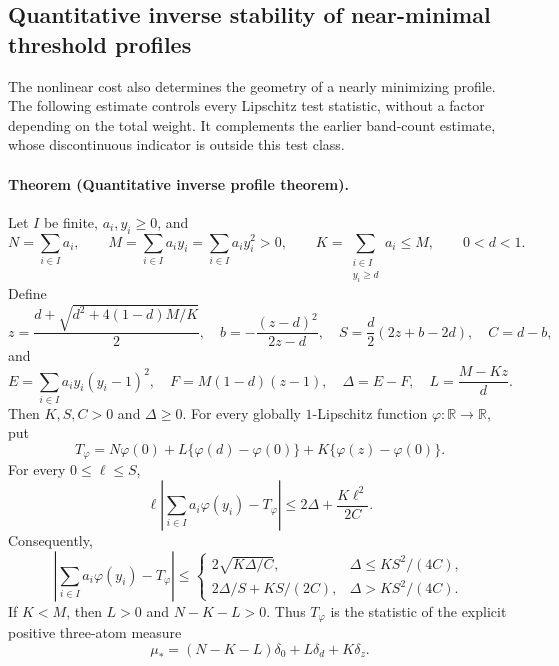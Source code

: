 \subsection{Quantitative inverse stability of near-minimal threshold profiles}
\label{subsec:threshold-transport-stability}

The nonlinear cost also determines the geometry of a nearly minimizing
profile.  The following estimate controls every Lipschitz test statistic,
without a factor depending on the total weight.  It complements the earlier
band-count estimate, whose discontinuous indicator is outside this test class.

\paragraph{Theorem (Quantitative inverse profile theorem).}
\label{thm:threshold-transport-stability}
Let \(I\) be finite, \(a_i,y_i\ge0\), and
\[
 N=\sum_{i\in I}a_i,\qquad
 M=\sum_{i\in I}a_i y_i=\sum_{i\in I}a_i y_i^2>0,\qquad
 K=\sum_{\substack{i\in I\\y_i\ge d}}a_i\le M,\qquad 0<d<1.
\]
Define
\[
 z=\frac{d+\sqrt{d^2+4(1-d)M/K}}2,\quad
 b=-\frac{(z-d)^2}{2z-d},\quad
 S=\frac d2(2z+b-2d),\quad C=d-b,
\]
and
\[
 E=\sum_{i\in I}a_i y_i(y_i-1)^2,\quad
 F=M(1-d)(z-1),\quad \Delta=E-F,\quad
 L=\frac{M-Kz}{d}.
\]
Then \(K,S,C>0\) and \(\Delta\ge0\).  For every globally
\(1\)-Lipschitz function \(\varphi:\mathbb R\to\mathbb R\), put
\[
 T_\varphi=N\varphi(0)+L\{\varphi(d)-\varphi(0)\}
                   +K\{\varphi(z)-\varphi(0)\}.
\]
For every \(0\le\ell\le S\),
\begin{equation}\label{eq:threshold-transport-tilt}
 \ell\left|\sum_{i\in I}a_i\varphi(y_i)-T_\varphi\right|
 \le 2\Delta+\frac{K\ell^2}{2C}.
\end{equation}
Consequently,
\begin{equation}\label{eq:threshold-transport-inverse}
 \left|\sum_{i\in I}a_i\varphi(y_i)-T_\varphi\right|
 \le
 \begin{cases}
  2\sqrt{K\Delta/C},&\Delta\le KS^2/(4C),\\
  2\Delta/S+KS/(2C),&\Delta>KS^2/(4C).
 \end{cases}
\end{equation}
If \(K<M\), then \(L>0\) and \(N-K-L>0\).  Thus \(T_\varphi\)
is the statistic of the explicit positive three-atom measure
\[
 \mu_*=(N-K-L)\delta_0+L\delta_d+K\delta_z.
\]


